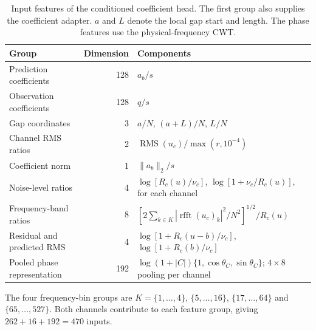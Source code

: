 \documentclass[10pt,prd,aps,a4paper,twocolumn,superscriptaddress,nofootinbib,floatfix]{revtex4-2}
\begin{document}
\begin{table}[t]\centering
\caption{Input features of the conditioned coefficient head. The first group also supplies the coefficient adapter. $a$ and $L$ denote the local gap start and length. The phase features use the physical-frequency CWT.}\label{tab:head_features}
\begin{tabular}{lrl}\hline\hline
Group & Dimension & Components\\\hline
Prediction coefficients & 128 & $a_b/s$\\
Observation coefficients & 128 & $q/s$\\
Gap coordinates & 3 & $a/N$, $(a+L)/N$, $L/N$\\
Channel RMS ratios & 2 & $\operatorname{RMS}(u_c)/\max(r,10^{-4})$\\
Coefficient norm & 1 & $\|a_b\|_2/s$\\\hline
Noise-level ratios & 4 & $\log[R_c(u)/\nu_c]$, $\log[1+\nu_c/R_c(u)]$, for each channel\\
Frequency-band ratios & 8 & $[2\sum_{k\in K}|\operatorname{rfft}(u_c)_k|^2/N^2]^{1/2}/R_c(u)$\\
Residual and predicted RMS & 4 & $\log[1+R_c(u-b)/\nu_c]$, $\log[1+R_c(b)/\nu_c]$\\\hline
Pooled phase representation & 192 & $\log(1+|C|)\{1,\cos\theta_C,\sin\theta_C\}$; $4\times8$ pooling per channel\\
\hline\hline\end{tabular}

\smallskip\parbox{0.96\textwidth}{The four frequency-bin groups are $K=\{1,\ldots,4\}$, $\{5,\ldots,16\}$, $\{17,\ldots,64\}$ and $\{65,\ldots,527\}$. Both channels contribute to each feature group, giving $262+16+192=470$ inputs.}
\end{table}
\end{document}
